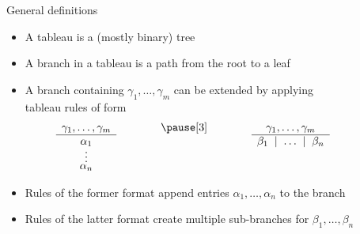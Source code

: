 \begin{frame}{General definitions}

\begin{itemize}
\item
A \alert{tableau} is a (mostly binary) tree
\item
A \alert{branch} in a tableau is a path from the root to a leaf
\item<2->
A branch containing $\gamma_1,\dots,\gamma_m$ can be extended by
applying\\ \alert{tableau rules} of form
\[
\begin{array}[t]{c}
\gamma_1,\dots,\gamma_m\\
\hline
\alpha_1\\[-1mm]
\vdots\\[-2mm]
\alpha_n
\end{array}
\qquad\qquad\pause[3]\qquad\qquad
\begin{array}[t]{c}
\gamma_1,\dots,\gamma_m\\
\hline
\beta_1\; \mid \; \dots \; \mid \;\beta_n
\end{array}
\qquad\qquad
\]
\item<2->
Rules of the former format append entries $\alpha_1,\dots,\alpha_n$ to the branch
\item<3->
Rules of the latter format create multiple sub-branches for $\beta_1,\dots,\beta_n$
\end{itemize}
\end{frame}
